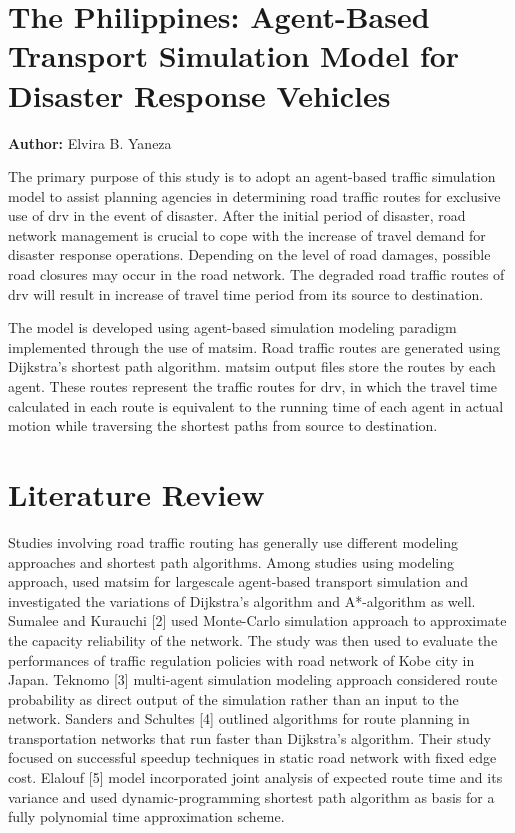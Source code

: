 \section{The Philippines: Agent-Based Transport Simulation Model for Disaster Response Vehicles}
\label{sec:philippines}
\hfill \textbf{Author:} Elvira B. Yaneza

The primary purpose of this study is to adopt an agent-based traffic simulation model to assist planning agencies in determining road traffic routes for exclusive use of \gls{drv} in the event of disaster. After the initial period of disaster, road network management is crucial to cope with the increase of travel demand for disaster response operations. Depending on the level of road damages, possible road closures may occur in the road network. The degraded road traffic routes of \gls{drv} will result in increase of travel time period from its source to destination.

The model is developed using agent-based simulation modeling paradigm implemented through the use of \gls{matsim}. Road traffic routes are generated using Dijkstra’s shortest path algorithm. \gls{matsim} output files store the routes by each agent. These routes represent the traffic routes for \gls{drv}, in which the travel time calculated in each route is equivalent to the running time of each agent in actual motion while traversing the shortest paths from source to destination. 

\section{Literature Review}
Studies involving road traffic routing has generally use different modeling approaches and shortest path algorithms. Among studies using modeling approach, \citet[][]{LefebvreBalmer_TechRep_IVT_2007} used \gls{matsim} for \gls{largescale} agent-based transport simulation and investigated the variations of Dijkstra’s algorithm and A*-algorithm as well. Sumalee and Kurauchi [2] used Monte-Carlo simulation approach to approximate the capacity reliability of the network. The study was then used to evaluate the performances of traffic regulation policies with road network of Kobe city in Japan. Teknomo [3] multi-agent simulation modeling approach considered route probability as direct output of the simulation rather than an input to the network. Sanders and Schultes [4] outlined algorithms for route planning in transportation networks that run faster than Dijkstra’s algorithm. Their study focused on successful speedup techniques in static road network with fixed edge cost. Elalouf [5] model incorporated joint analysis of expected route time and its variance and used dynamic-programming shortest path algorithm as basis for a fully polynomial time approximation scheme. 

